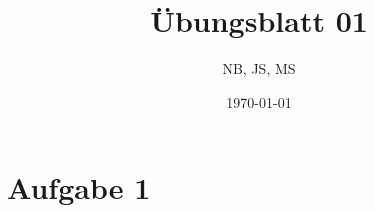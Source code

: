 \documentclass{scrartcl}
\title{Übungsblatt 01}
\author{%
  NB, JS, MS
}
\date{\today}
\begin{document}
\maketitle

\section{Aufgabe 1}
\end{document}
